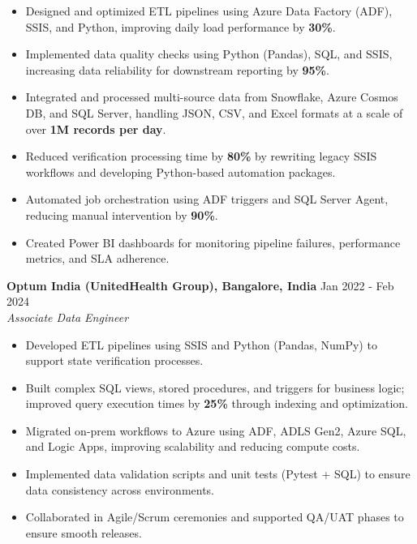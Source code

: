 \documentclass[a4paper,8pt]{article}
\begin{document}
\begin{itemize}[leftmargin=1.2em, itemsep=1pt, topsep=0pt, parsep=0pt, partopsep=0pt]
    \item Designed and optimized ETL pipelines using Azure Data Factory (ADF), SSIS, and Python, improving daily load performance by \textbf{30\%}.
    \item Implemented data quality checks using Python (Pandas), SQL, and SSIS, increasing data reliability for downstream reporting by \textbf{95\%}.
    \item Integrated and processed multi-source data from Snowflake, Azure Cosmos DB, and SQL Server, handling JSON, CSV, and Excel formats at a scale of over \textbf{1M records per day}.
    \item Reduced verification processing time by \textbf{80\%} by rewriting legacy SSIS workflows and developing Python-based automation packages.
    \item Automated job orchestration using ADF triggers and SQL Server Agent, reducing manual intervention by \textbf{90\%}.
    \item Created Power BI dashboards for monitoring pipeline failures, performance metrics, and SLA adherence.
\end{itemize}
\vspace{-0.5em}

\noindent
\textbf{Optum India (UnitedHealth Group), Bangalore, India} \hfill \textcolor[HTML]{371e77}{Jan 2022 - Feb 2024} \\
\textit{\textcolor[HTML]{371e77}{Associate Data Engineer}}\\[-1.7em]

\begin{itemize}[leftmargin=1.2em, itemsep=1pt, topsep=0pt, parsep=0pt, partopsep=0pt]
    \item Developed ETL pipelines using SSIS and Python (Pandas, NumPy) to support state verification processes.
    \item Built complex SQL views, stored procedures, and triggers for business logic; improved query execution times by \textbf{25\%} through indexing and optimization.
    \item Migrated on-prem workflows to Azure using ADF, ADLS Gen2, Azure SQL, and Logic Apps, improving scalability and reducing compute costs.
    \item Implemented data validation scripts and unit tests (Pytest + SQL) to ensure data consistency across environments.
    \item Collaborated in Agile/Scrum ceremonies and supported QA/UAT phases to ensure smooth releases.
\end{itemize}
\vspace{0em}
\end{document}

